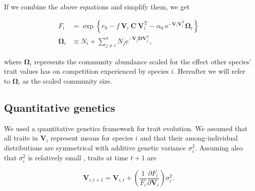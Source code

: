 If we combine the above equations and simplify them, we get

\begin{equation} \label{eq:fitness-full}
\begin{split}
    F_{i} &= \exp \left\{
        r_0 - f ~ \mathbf{V}_i ~ \mathbf{C} ~ \mathbf{V}_{i}^{\textrm{T}} -
        \alpha_0 ~\textrm{e}^{- \mathbf{V}_i \mathbf{V}_i^{\textrm{T}} } \mathbf{\Omega}_{i}
        \right\} \\
        \mathbf{\Omega}_i &\equiv N_i +
            \sum_{j \ne i}^{n}{ N_j \textrm{e}^{ - \mathbf{V}_j \mathbf{D} \mathbf{V}_j^{\textrm{T}} } }
        \textrm{,}
\end{split}
\end{equation}

\noindent where $\mathbf{\Omega}_i$ represents the community abundance scaled
for the effect other species' trait values has on competition
experienced by species $i$.
Hereafter we will refer to $\mathbf{\Omega}_i$ as the scaled community size.




%


\subsection*{Quantitative genetics}

We used a quantitative genetics framework for trait evolution.
We assumed that all traits in $\mathbf{V}_i$ represent means for species $i$
and that their among-individual distributions are symmetrical with additive
genetic variance $\sigma^2_i$.
Assuming also that $\sigma^2_i$ is relatively small
\citep{Iwasa:1991eo,Abrams:2001va,Abrams:1993cr}, traits at time $t+1$ are

\begin{equation} \label{eq:trait-change}
    \mathbf{V}_{i,t+1} = \mathbf{V}_{i,t} + \left( \frac{1}{F_i}
        \frac{\partial F_i}{\partial \mathbf{V}_{i}} \right) \sigma^2_i
    \textrm{.}
\end{equation}

